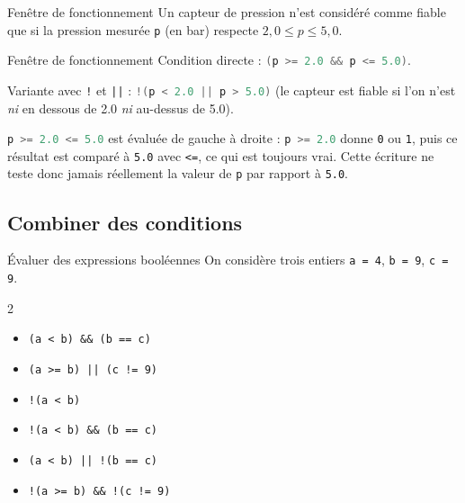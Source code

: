 \begin{UPSTIexercice}{Fenêtre de fonctionnement}
    Un capteur de pression n'est considéré comme fiable que si la pression mesurée \texttt{p} (en bar) respecte \(2{,}0 \le p \le 5{,}0\).
\end{UPSTIexercice}

\begin{UPSTIprofOnlyEnv}
    \begin{UPSTIcorrectionP}{Fenêtre de fonctionnement}
        Condition directe : \lstinline[language=C]{(p >= 2.0 && p <= 5.0)}.

        Variante avec \texttt{!} et \texttt{||} : \lstinline[language=C]{!(p < 2.0 || p > 5.0)} (le capteur est fiable si l'on n'est \emph{ni} en dessous de 2.0 \emph{ni} au-dessus de 5.0).

        \lstinline[language=C]{p >= 2.0 <= 5.0} est évaluée de gauche à droite : \lstinline[language=C]{p >= 2.0} donne \texttt{0} ou \texttt{1}, puis ce résultat est comparé à \texttt{5.0} avec \texttt{<=}, ce qui est toujours vrai. Cette écriture ne teste donc jamais réellement la valeur de \texttt{p} par rapport à \texttt{5.0}.
    \end{UPSTIcorrectionP}
\end{UPSTIprofOnlyEnv}


\subsection{Combiner des conditions}

\begin{UPSTIexercice}{Évaluer des expressions booléennes}
    On considère trois entiers \texttt{a = 4}, \texttt{b = 9}, \texttt{c = 9}.
    \begin{multicols}{2}
        \begin{itemize}
            \item \verb|(a < b) && (b == c)|
            \item \verb$(a >= b) || (c != 9)$
            \item \verb|!(a < b)|
            \item \verb|!(a < b) && (b == c)|
            \item \verb$(a < b) || !(b == c)$
            \item \verb$!(a >= b) && !(c != 9)$
        \end{itemize}
    \end{multicols}
\end{UPSTIexercice}

